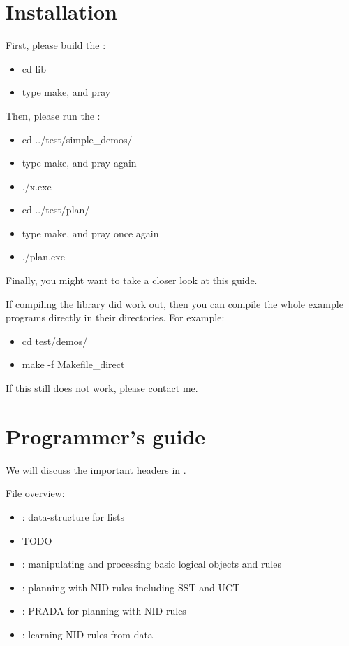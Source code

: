 \documentclass[10pt,twoside,twocolumn,fleqn]{article}
\begin{document}

\section{Installation}

First, please build the :
\begin{itemize}
\item cd lib
\item type make, and pray
\end{itemize}
Then, please run the :
\begin{itemize}
\item cd ../test/simple\_demos/
\item type make, and pray again
\item ./x.exe
\item cd ../test/plan/
\item type make, and pray once again
\item ./plan.exe
\end{itemize}
Finally, you might want to take a closer look at this guide.

If compiling the library did  work out, then you can compile the
whole example programs directly in their directories. For example:
\begin{itemize}
\item cd test/demos/
\item make -f Makefile\_direct
\end{itemize}
If this still does not work, please contact me.




\section{Programmer's guide}

We will discuss the important headers in .

\noindent File overview:
\begin{itemize}
\item {}: data-structure for lists
\item TODO
\item {}: manipulating and processing basic
logical objects and rules
\item {}: planning with NID rules including SST and
UCT
\item {}: PRADA for planning with NID rules
\item {}: learning NID rules from data
\end{itemize}
\end{document}
